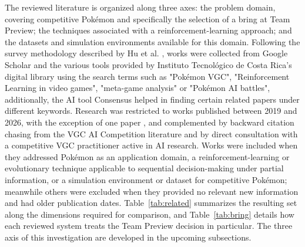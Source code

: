 \documentclass[conference]{IEEEtran}
\begin{document}
The reviewed literature is organized along three axes: the problem domain,
covering competitive Pok\'emon and specifically the selection of a bring at
Team Preview; the techniques associated with a reinforcement-learning approach;
and the datasets and simulation environments available for this domain.
Following the survey methodology described by Hu et al. \cite{hu2024}, works
were collected from Google Scholar and the various tools provided by Instituto Tecnológico de Costa Rica's digital library using the search terms such as "Pokémon VGC", "Reinforcement Learning in video games", "meta-game analysis" or "Pokémon AI battles", additionally, the AI tool Consensus helped in finding certain related papers under different keywords. Research was restricted to works published between 2019 and 2026, with the exception of one paper \cite{galway2008}, and complemented by backward citation chasing from the VGC AI Competition literature and by direct consultation with a competitive VGC practitioner active in AI research. Works were included when they addressed Pok\'emon as an application domain, a reinforcement-learning or evolutionary technique applicable to sequential decision-making under partial information, or a simulation environment or dataset for competitive Pok\'emon;
meanwhile others were excluded when they provided no relevant new information and had older publication dates. Table~\ref{tab:related} summarizes the resulting
set along the dimensions required for comparison, and Table~\ref{tab:bring}
details how each reviewed system treats the Team Preview decision in
particular. The three axis of this investigation are developed in the upcoming subsections.
\end{document}
